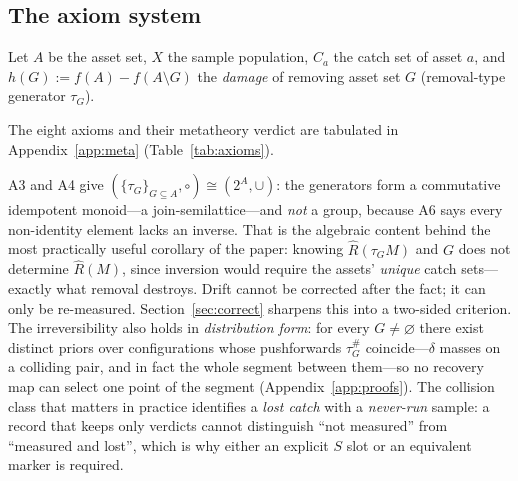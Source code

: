 \documentclass{article}
\newcommand{\Rhat}{\hat R}
\begin{document}
\subsection{The axiom system}
\label{sec:axioms}

Let $A$ be the asset set, $X$ the sample population, $C_a$ the catch set of asset $a$, and
$h(G):=f(A)-f(A\setminus G)$ the \emph{damage} of removing asset set $G$ (removal-type generator $\tau_G$).


The eight axioms and their metatheory verdict are tabulated in Appendix~\ref{app:meta} (Table~\ref{tab:axioms}).


A3 and A4 give $(\{\tau_G\}_{G\subseteq A},\circ)\cong(2^{A},\cup)$: the generators form a commutative
idempotent monoid---a join-semilattice---and \emph{not} a group, because A6 says every non-identity element
lacks an inverse. That is the algebraic content behind the most practically useful corollary of the paper:
knowing $\Rhat(\tau_G M)$ and $G$ does not determine $\Rhat(M)$, since inversion would require the assets'
\emph{unique} catch sets---exactly what removal destroys. Drift cannot be corrected after the fact; it can
only be re-measured. Section~\ref{sec:correct} sharpens this into a two-sided criterion. The irreversibility
also holds in \emph{distribution form}: for every $G\neq\varnothing$ there exist distinct priors over
configurations whose pushforwards $\tau_G^{\#}$ coincide---$\delta$ masses on a colliding pair, and in fact
the whole segment between them---so no recovery map can select one point of the segment
(Appendix~\ref{app:proofs}). The collision class that matters in practice identifies a \emph{lost catch}
with a \emph{never-run} sample: a record that keeps only verdicts cannot distinguish ``not measured'' from
``measured and lost'', which is why either an explicit $S$ slot or an equivalent marker is required.
\end{document}
